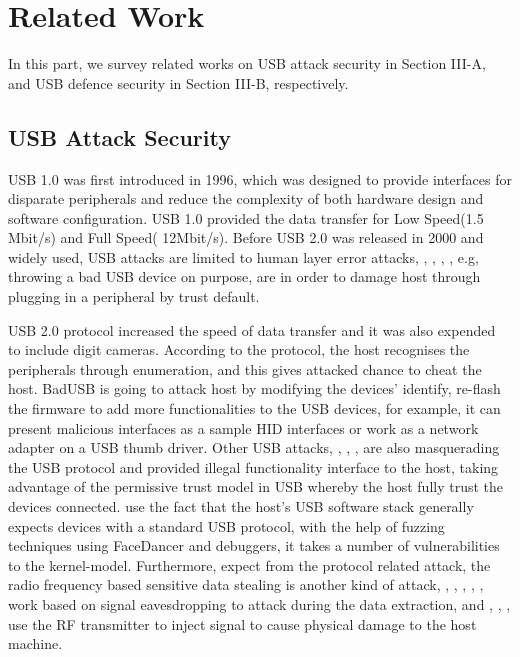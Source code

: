 \section{Related Work}
\label{sec:related_work}
In this part, we survey related works on USB attack security in Section III-A, and USB defence security in Section III-B, respectively.
\subsection{USB Attack Security}
USB 1.0\cite{usb01} was first introduced in 1996, which was designed to provide interfaces for disparate peripherals and reduce the complexity of both hardware design and software configuration\cite{sok}. USB 1.0 provided the data transfer for Low Speed(1.5 Mbit/s) and Full Speed( 12Mbit/s). Before USB 2.0 was released in 2000 and widely used, USB attacks are limited to human layer error attacks, \cite{se}, \cite{goverment}, \cite{atkvec}, \cite{ueerreallydo}, e.g, throwing a bad USB device on purpose, are in order to damage host through plugging in a peripheral by trust default. 

USB 2.0 protocol increased the speed of data transfer and it was also expended to include digit cameras. According to the protocol, the host recognises the peripherals through enumeration, and this gives attacked chance to cheat the host. BadUSB\cite{badusb} is going to attack host by modifying the devices' identify, re-flash the firmware to add more functionalities to the USB devices, for example, it can present malicious interfaces as a sample HID interfaces or work as a network adapter on a USB thumb driver. Other USB attacks, \cite{rubber}, \cite{usbdriver}, \cite{usbbypassing}, \cite{iseeyou} are also masquerading the USB protocol and provided illegal functionality interface to the host, taking advantage of the permissive trust model in USB whereby the host fully trust the devices connected. \cite{syzkaller} use the fact that the host's USB software stack generally expects devices with a standard USB protocol, with the help of fuzzing techniques using FaceDancer \cite{facedancer} and debuggers, it takes a number of vulnerabilities to the kernel-model. Furthermore, expect from the protocol related attack, the radio frequency based sensitive data stealing is another kind of attack, \cite{smartphone} , \cite{poweremi}, \cite{badusbhub}, \cite{usbfinger}, \cite{side}, \cite{usbdriver} work based on signal eavesdropping to attack during the data extraction, and \cite{usbkiller}, \cite{cable}, \cite{usbee}, \cite{turnip} use the RF transmitter to inject signal to cause physical damage to the host machine.    

